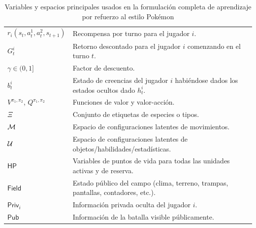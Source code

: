 \begin{table}[h]
\begin{tabular}{ll}
        $r_i(s_t,a_t^1,a_t^2,s_{t+1})$       & Recompensa por turno para el jugador $i$.                                              \\
        $G_t^i$                              & Retorno descontado para el jugador $i$ comenzando en el turno $t$.                     \\
        $\gamma \in (0,1]$                   & Factor de descuento.                                                                   \\
        $b_t^i$                              & Estado de creencias del jugador $i$ habiéndose dados los estados ocultos dado $h_t^i$. \\
        $V^{\pi_1,\pi_2}$, $Q^{\pi_1,\pi_2}$ & Funciones de valor y valor-acción.                                                     \\
        $\Xi$                                & Conjunto de etiquetas de especies o tipos.                                             \\
        $\mathcal{M}$                                & Espacio de configuraciones latentes de movimientos.                                    \\
        $\mathcal{U}$                                & Espacio de configuraciones latentes de objetos/habilidades/estadísticas.               \\
        $\mathsf{HP}$                        & Variables de puntos de vida para todas las unidades activas y de reserva.              \\
        $\mathsf{Field}$                     & Estado público del campo (clima, terreno, trampas, pantallas, contadores, etc.).       \\
        $\mathsf{Priv}_i$                    & Información privada oculta del jugador $i$.                                            \\
        $\mathsf{Pub}$                       & Información de la batalla visible públicamente.                                        \\
        \bottomrule
    \end{tabular}
    \caption{Variables y espacios principales usados en la formulación completa de aprendizaje por refuerzo al estilo Pokémon}
    \label{tab:caracteristicas}
\end{table}

